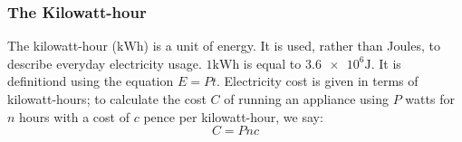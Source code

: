 \subsubsection{The Kilowatt-hour}

The kilowatt-hour ($\si{\kilo\watt\hour}$) is a unit of energy. It is used, rather than Joules, to describe everyday electricity usage. $1\si{\kilo\watt\hour}$ is equal to $\num{3.6e6}\si{\joule}$. It is definitiond using the equation $E=Pt$. Electricity cost is given in terms of kilowatt-hours; to calculate the cost $C$ of running an appliance using $P$ watts for $n$ hours with a cost of $c$ pence per kilowatt-hour, we say:
\begin{equation}
	C=Pnc
	\label{eq:ecost}
\end{equation}